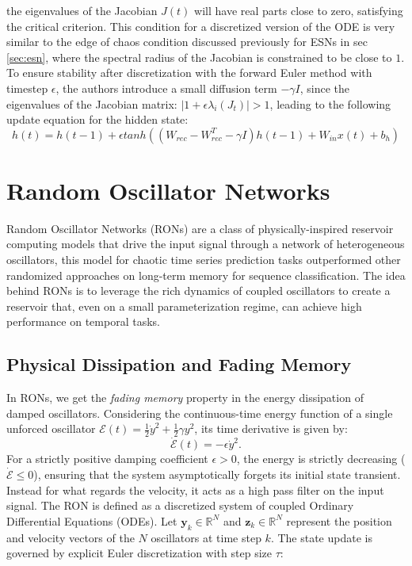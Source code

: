 the eigenvalues of the Jacobian $J(t)$ will have real parts close to zero, satisfying the critical criterion.
\newline\newline
This condition for a discretized version of the ODE is very similar to the edge of chaos condition discussed previously for ESNs in sec \ref{sec:esn}, where the spectral radius of the Jacobian is constrained to be close to $1$.
To ensure stability after discretization with the forward Euler method with timestep $\epsilon$, the authors introduce a small diffusion term
$-\gamma I$, since the eigenvalues of the Jacobian matrix: $|1+ \epsilon\lambda_i(J_t)| > 1$, leading to the following update equation for the hidden state:
\begin{equation}
    h(t) = h(t-1) + \epsilon tanh((W_{rec}-W_{rec}^T-\gamma I)h(t-1) + W_{in}x(t)+b_h)
\end{equation} 

\section{Random Oscillator Networks}
Random Oscillator Networks (RONs) \cite{pmlr-v238-ceni24a} are a class of physically-inspired reservoir computing models that drive the input signal through
a network of heterogeneous oscillators, this model for chaotic time series prediction tasks outperformed other randomized approaches on long-term memory for sequence classification.
The idea behind RONs is to leverage the rich dynamics of coupled oscillators to create a reservoir that, even on a small parameterization regime, can achieve high performance on temporal tasks.
\newline
\subsection*{Physical Dissipation and Fading Memory}
 In RONs, we get the \textit{fading memory} property in the energy dissipation of damped oscillators. 
 Considering the continuous-time energy function of a single unforced oscillator $\mathcal{E}(t) = \frac{1}{2}\dot{y}^2 + \frac{1}{2}\gamma y^2$, its time derivative is given by:
\begin{equation}
    \dot{\mathcal{E}}(t) = -\epsilon \dot{y}^2.
\end{equation}
For a strictly positive damping coefficient $\epsilon > 0$, the energy is strictly decreasing ($\dot{\mathcal{E}} \leq 0$), ensuring that the system asymptotically forgets its initial state transient.
Instead for what regards the velocity, it acts as a high pass filter on the input signal.
\newline\newline
The RON is defined as a discretized system of coupled Ordinary Differential Equations (ODEs). Let $\mathbf{y}_k \in \mathbb{R}^N$ and $\mathbf{z}_k \in \mathbb{R}^N$ represent the position and velocity vectors of the $N$ oscillators at time step $k$. 
The state update is governed by explicit Euler discretization with step size $\tau$:

